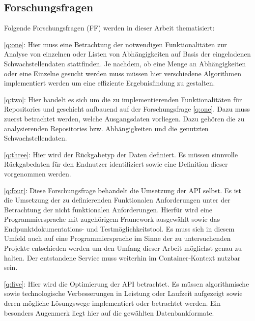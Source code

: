 \subsection{Forschungsfragen} \label{sec:Forschungsfragen}
    Folgende Forschungsfragen (FF) werden in dieser Arbeit thematisiert:

    \ref{q:one}:
    Hier muss eine Betrachtung der notwendigen Funktionalitäten zur Analyse von einzelnen oder Listen von Abhängigkeiten auf Basis der eingeladenen Schwachstellendaten stattfinden.
    Je nachdem, ob eine Menge an Abhängigkeiten oder eine Einzelne gesucht werden muss müssen hier verschiedene Algorithmen implementiert werden um eine effiziente Ergebnisfindung zu gestalten.

    \ref{q:two}:
    Hier handelt es sich um die zu implementierenden Funktionalitäten für Repositories und geschieht aufbauend auf der Forschungsfrage \ref{q:one}.
    Dazu muss zuerst betrachtet werden, welche Ausgangsdaten vorliegen.
    Dazu gehören die zu analysierenden Repositories bzw. Abhängigkeiten und die genutzten Schwachstellendaten.

    \ref{q:three}:
    Hier wird der Rückgabetyp der Daten definiert.
    Es müssen sinnvolle Rückgabedaten für den Endnutzer identifiziert sowie eine Definition dieser vorgenommen werden.

    \ref{q:four}:
    Diese Forschungsfrage behandelt die Umsetzung der \ac{API} selbst.
    Es ist die Umsetzung der zu definierenden Funktionalen Anforderungen unter der Betrachtung der nicht funktionalen Anforderungen.
    Hierfür wird eine Programmiersprache mit zugehörigem Framework ausgewählt sowie das End\-punkt\-doku\-mentations- und Test\-möglich\-keits\-tool.
    Es muss sich in diesem Umfeld auch auf eine Programmiersprache im Sinne der zu untersuchenden Projekte entschieden werden um den Umfang dieser Arbeit möglichst genau zu halten.
    Der entstandene Service muss weiterhin im Container-Kontext nutzbar sein.

    \ref{q:five}:
    Hier wird die Optimierung der \ac{API} betrachtet.
    Es müssen algorithmische sowie technologische Verbesserungen in Leistung oder Laufzeit aufgezeigt sowie deren mögliche Lösungswege implementiert oder betrachtet werden.
    Ein besonders Augenmerk liegt hier auf die gewählten Datenbankformate.
